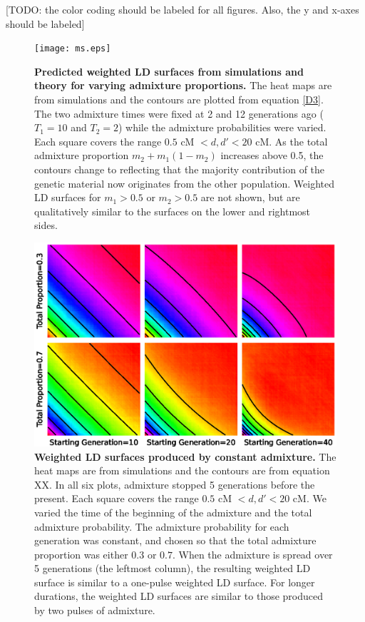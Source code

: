 \documentclass[10pt]{article}
\begin{document}
[TODO: the color coding should be labeled for all figures.  Also, the y and
x-axes should be labeled]

\begin{figure} \texttt{[image: ms.eps]} \caption{ {\bf Predicted
weighted LD surfaces from simulations and theory for varying admixture
proportions.} The heat maps are from simulations and the contours are plotted
from equation \ref{D3}. The two admixture times were fixed at 2 and 12
generations ago ($T_1=10$ and $T_2=2$) while the admixture probabilities were
varied. Each square covers the range $0.5 \text{ cM }<d,d'<20\text{ cM}$. As the
total admixture proportion $m_2+m_1(1-m_2)$ increases above 0.5, the contours
change to reflecting that the majority contribution of the genetic material now
originates from the other population. Weighted LD surfaces for $m_1>0.5$ or
$m_2>0.5$ are not shown, but are qualitatively similar to the surfaces on the
lower and rightmost sides. } \label{ms} \end{figure}

\begin{figure} \includegraphics[scale=.8]{continuous.eps} \caption{ {\bf
Weighted LD surfaces produced by constant admixture.} The heat maps are from
simulations and the contours are from equation XX. In all six plots, admixture
stopped 5 generations before the present. Each square covers the range $0.5
\text{ cM }<d,d'<20\text{ cM}$. We varied the time of the beginning of the
admixture and the total admixture probability. The admixture probability for
each generation was constant, and chosen so that the total admixture proportion
was either $0.3$ or $0.7$. When the admixture is spread over 5 generations (the
leftmost column), the resulting weighted LD surface is similar to a one-pulse
weighted LD surface. For longer durations, the weighted LD surfaces are similar
to those produced by two pulses of admixture. } \label{continuous} \end{figure}
\end{document}
